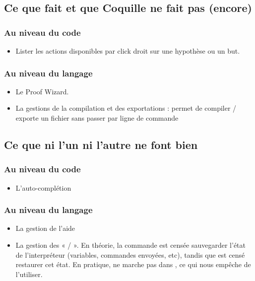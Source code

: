     \subsection{Ce que \coqide{} fait et que Coquille ne fait pas (encore)}
    
        \subsubsection{Au niveau du code}

            \begin{itemize}
                \item Lister les actions disponibles par click droit sur une hypothèse ou un but.
            \end{itemize}

        \subsubsection{Au niveau du langage}
        
            \begin{itemize}
                \item Le Proof Wizard.
                \item La gestions de la compilation et des exportations : \coqide{} permet de compiler / exporte un fichier sans passer par ligne de commande
            \end{itemize}

    \subsection{Ce que ni l'un ni l'autre ne font bien}

        \subsubsection{Au niveau du code}

            \begin{itemize}
                \item L'auto-complétion
            \end{itemize}

        \subsubsection{Au niveau du langage}
        
            \begin{itemize}
                \item La gestion de l'aide
                \item La gestion des «  /  ».
                En théorie, la commande  est censée sauvegarder l'état de l'interpréteur (variables, commandes envoyées, etc), tandis que  est censé restaurer cet état.
			    En pratique,  ne marche pas dans \coqtop{}, ce qui nous empêche de l'utiliser.
            \end{itemize}

